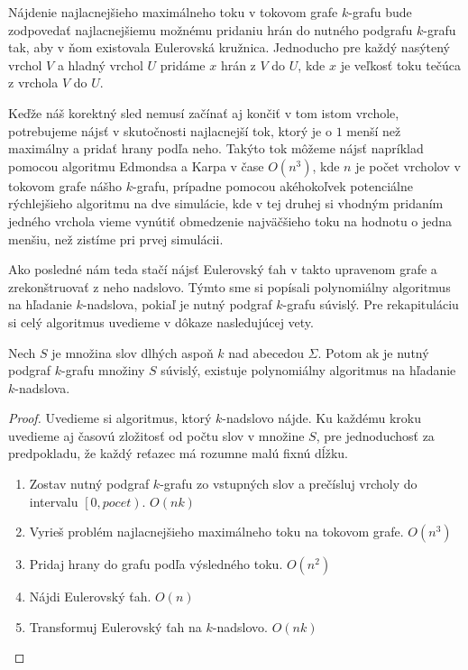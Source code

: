 Nájdenie najlacnejšieho maximálneho toku v tokovom grafe $k$-grafu bude zodpovedať
najlacnejšiemu možnému pridaniu hrán do nutného podgrafu $k$-grafu tak, aby v ňom existovala Eulerovská
kružnica. Jednoducho pre každý nasýtený vrchol $V$ a hladný vrchol $U$ pridáme $x$ hrán z $V$ do $U$,
kde $x$ je veľkosť toku tečúca z vrchola $V$ do $U$.

Keďže náš korektný sled nemusí začínať aj končiť v tom istom vrchole, potrebujeme
nájsť v skutočnosti najlacnejší tok, ktorý je o $1$ menší než maximálny a pridať hrany podľa neho.
Takýto tok môžeme nájsť napríklad pomocou algoritmu Edmondsa a Karpa \cite{mincost_maxflow} v
čase $O(n^3)$, kde $n$ je počet vrcholov v tokovom grafe nášho $k$-grafu, prípadne pomocou akéhokoľvek potenciálne rýchlejšieho
algoritmu na dve simulácie, kde v tej druhej si vhodným pridaním jedného vrchola vieme vynútiť
obmedzenie najväčšieho toku na hodnotu o jedna menšiu, než zistíme pri prvej simulácii.

Ako posledné nám teda stačí nájsť Eulerovský ťah v takto upravenom grafe a zrekonštruovať z neho
nadslovo. Týmto sme si popísali polynomiálny algoritmus na hľadanie $k$-nadslova, pokiaľ je
nutný podgraf $k$-grafu súvislý. Pre rekapituláciu si celý algoritmus uvedieme v dôkaze nasledujúcej
vety.

\begin{veta}
    Nech $S$ je množina slov dlhých aspoň $k$ nad abecedou $\Sigma$. Potom ak je nutný podgraf $k$-grafu množiny $S$
    súvislý, existuje polynomiálny algoritmus na hľadanie $k$-nadslova.
\end{veta}

\begin{proof}
    Uvedieme si algoritmus, ktorý $k$-nadslovo nájde. Ku každému kroku uvedieme aj časovú zložitosť od počtu slov v
    množine $S$, pre jednoduchosť za predpokladu, že každý reťazec má rozumne malú fixnú dĺžku.
    \begin{enumerate}
        \item Zostav nutný podgraf $k$-grafu zo vstupných slov a prečísluj vrcholy do intervalu $\left[0, pocet\right)$. $O(nk)$
        \item Vyrieš problém najlacnejšieho maximálneho toku na tokovom grafe. $O(n^3)$
        \item Pridaj hrany do grafu podľa výsledného toku. $O(n^2)$
        \item Nájdi Eulerovský ťah. $O(n)$
        \item Transformuj Eulerovský ťah na $k$-nadslovo. $O(nk)$ \qedhere
    \end{enumerate}
\end{proof}

